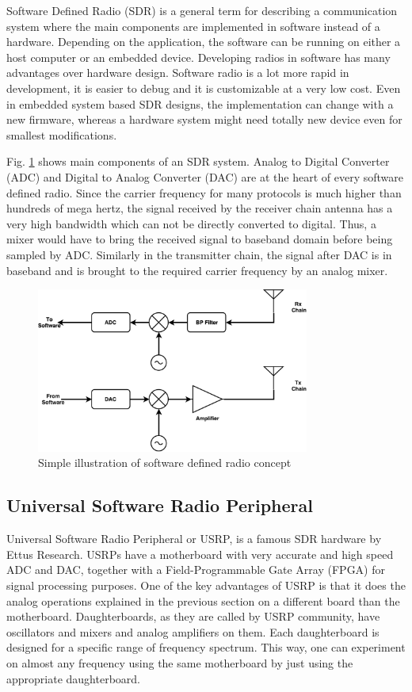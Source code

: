 Software Defined Radio (SDR) is a general term for describing a communication system where the main components are implemented in software instead of a hardware. Depending on the application, the software can be running on either a host computer or an embedded device. Developing radios in software has many advantages over hardware design. Software radio is a lot more rapid in development, it is easier to debug and it is customizable at a very low cost. Even in embedded system based SDR designs, the implementation can change with a new firmware, whereas a hardware system might need totally new device even for smallest modifications.

Fig. \ref{fig:sdr} shows main components of an SDR system. Analog to Digital Converter (ADC) and Digital to Analog Converter (DAC) are at the heart of every software defined radio. Since the carrier frequency for many protocols is much higher than hundreds of mega hertz, the signal received by the receiver chain antenna has a very high bandwidth which can not be directly converted to digital. Thus, a mixer would have to bring the received signal to baseband domain before being sampled by ADC. Similarly in the transmitter chain, the signal after DAC is in baseband and is brought to the required carrier frequency by an analog mixer.

\begin{figure} [th]
    \centering
    \includegraphics[width=0.8\textwidth]{figures/sdr.pdf}
    \caption{Simple illustration of software defined radio concept} \label{fig:sdr}
\end{figure}

\subsection{Universal Software Radio Peripheral}

Universal Software Radio Peripheral or USRP, is a famous SDR hardware by Ettus Research. USRPs have a motherboard with very accurate and high speed ADC and DAC, together with a Field-Programmable Gate Array (FPGA) for signal processing purposes. One of the key advantages of USRP is that it does the analog operations explained in the previous section on a different board than the motherboard. Daughterboards, as they are called by USRP community, have oscillators and mixers and analog amplifiers on them. Each daughterboard is designed for a specific range of frequency spectrum. This way, one can experiment on almost any frequency using the same motherboard by just using the appropriate daughterboard.

